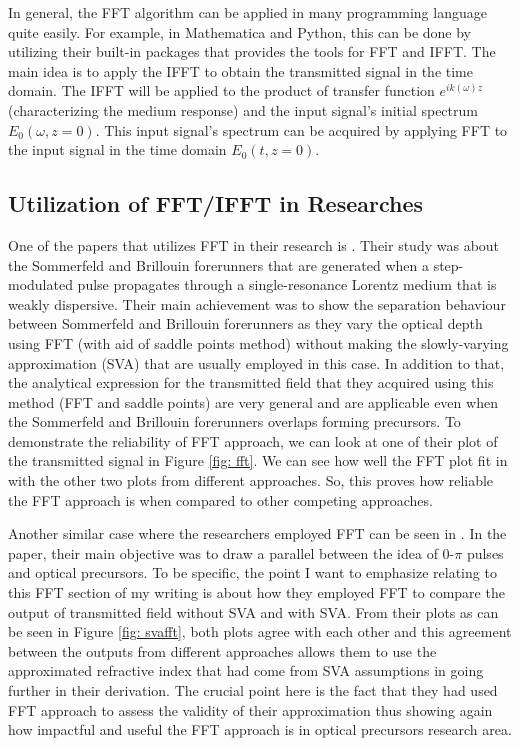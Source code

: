 In general, the FFT algorithm can be applied in many programming language quite easily. For example, in Mathematica and Python, this can be done by utilizing their built-in packages that provides the tools for FFT and IFFT. The main idea is to apply the IFFT to obtain the transmitted signal in the time domain. The IFFT will be applied to the product of transfer function $e^{i k(\omega)z}$ (characterizing the medium response) and the input signal's initial spectrum $E_{0}(\omega, z = 0)$. This input signal's spectrum can be acquired by applying FFT to the input signal in the time domain $E_{0}(t, z = 0)$.

\subsection{Utilization of FFT/IFFT in Researches}
One of the papers that utilizes FFT in their research is \cite{Macke2013}. Their study was about the Sommerfeld and Brillouin forerunners that are generated when a step-modulated pulse propagates through a single-resonance Lorentz medium that is weakly dispersive. Their main achievement was to show the separation behaviour between Sommerfeld and Brillouin forerunners as they vary the optical depth using FFT (with aid of saddle points method) without making the slowly-varying approximation (SVA) that are usually employed in this case. In addition to that, the analytical expression for the transmitted field that they acquired using this method (FFT and saddle points) are very general and are applicable even when the Sommerfeld and Brillouin forerunners overlaps forming precursors. To demonstrate the reliability of FFT approach, we can look at one of their plot of the transmitted signal in Figure \ref{fig: fft}. We can see how well the FFT plot fit in with the other two plots from different approaches. So, this proves how reliable the FFT approach is when compared to other competing approaches.

Another similar case where the researchers employed FFT can be seen in \cite{Jeong2008}. In the paper, their main objective was to draw a parallel between the idea of 0-$\pi$ pulses and optical precursors. To be specific, the point I want to emphasize relating to this FFT section of my writing is about how they employed FFT to compare the output of transmitted field without SVA and with SVA. From their plots as can be seen in Figure \ref{fig: svafft}, both plots agree with each other and this agreement between the outputs from different approaches allows them to use the approximated refractive index that had come from SVA assumptions in going further in their derivation. The crucial point here is the fact that they had used FFT approach to assess the validity of their approximation thus showing again how impactful and useful the FFT approach is in optical precursors research area.

